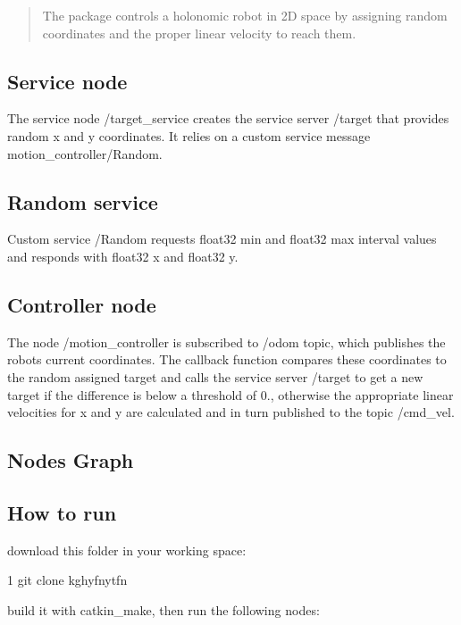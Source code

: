 \begin{quote}
The package controls a holonomic robot in 2D space by assigning random coordinates and the proper linear velocity to reach them. \end{quote}


\subsection*{Service node}

The service node {\ttfamily /target\+\_\+service} creates the service server {\ttfamily /target} that provides random x and y coordinates. It relies on a custom service message {\ttfamily motion\+\_\+controller/\+Random}.

\subsection*{Random service}

Custom service /\+Random requests {\ttfamily float32 min} and {\ttfamily float32 max} interval values and responds with {\ttfamily float32 x} and {\ttfamily float32 y}.

\subsection*{Controller node}

The node {\ttfamily /motion\+\_\+controller} is subscribed to {\ttfamily /odom} topic, which publishes the robot\textquotesingle{}s current coordinates. The callback function compares these coordinates to the random assigned target and calls the service server {\ttfamily /target} to get a new target if the difference is below a threshold of 0., otherwise the appropriate linear velocities for x and y are calculated and in turn published to the topic {\ttfamily /cmd\+\_\+vel}.

\subsection*{Nodes Graph}



\subsection*{How to run}

download this folder in your working space\+:


\begin{DoxyCode}
1 git clone kghyfnytfn
\end{DoxyCode}
 build it with {\ttfamily catkin\+\_\+make}, then run the following nodes\+:


 